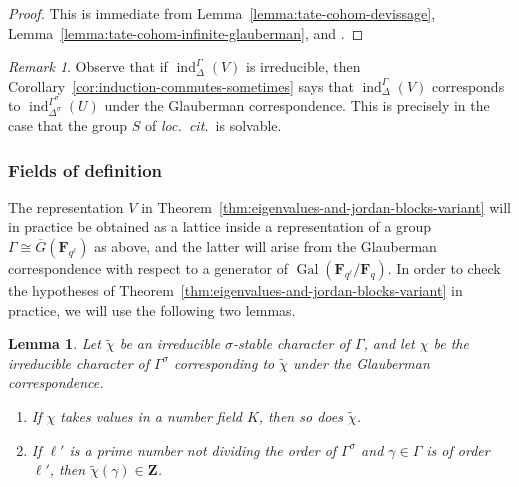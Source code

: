 \documentclass[reqno]{amsart}
\numberwithin{equation}{subsection}
\newcommand{\F}{\mathbf{F}}
\newcommand{\Z}{\mathbf{Z}}
\newcommand{\Gal}{\operatorname{Gal}}
\newcommand{\ol}[1]{\overline{#1}}
\DeclareMathOperator{\ind}{ind}
\newtheorem{lemma}[thm]{Lemma}
\theoremstyle{remark}
\newtheorem{remark}[thm]{Remark}
\numberwithin{equation}{subsection}
\numberwithin{figure}{subsection}
\begin{document}
\begin{proof}
    This is immediate from Lemma~\ref{lemma:tate-cohom-devissage}, Lemma~\ref{lemma:tate-cohom-infinite-glauberman}, and \cite[Proposition~3.3]{TV}. 
\end{proof}

\begin{remark}\label{remark:isaacs-navarro}
    Observe that if $\ind_\Delta^\Gamma(V)$ is irreducible, then Corollary~\ref{cor:induction-commutes-sometimes} says that $\ind_\Delta^\Gamma(V)$ corresponds to $\ind_{\Delta^\sigma}^{\Gamma^\sigma}(U)$ under the Glauberman correspondence. This is precisely \cite[Theorem~A (a)]{IN91} in the case that the group $S$ of \textit{loc.\ cit.}\ is solvable.
\end{remark}

\subsubsection{Fields of definition} The representation $V$ in Theorem~\ref{thm:eigenvalues-and-jordan-blocks-variant} will in practice be obtained as a lattice inside a representation of a group $\Gamma \cong \ol G(\F_{q^\ell})$ as above, and the latter will arise from the Glauberman correspondence with respect to a generator of $\Gal(\F_{q^\ell}/\F_q)$. In order to check the hypotheses of Theorem~\ref{thm:eigenvalues-and-jordan-blocks-variant} in practice, we will use the following two lemmas.

\begin{lemma}\label{lemma:integer-valued-characters}
    Let $\widetilde{\chi}$ be an irreducible $\sigma$-stable character of $\Gamma$, and let $\chi$ be the irreducible character of $\Gamma^\sigma$ corresponding to $\widetilde{\chi}$ under the Glauberman correspondence.
    \begin{enumerate}
        \item If $\chi$ takes values in a number field $K$, then so does $\widetilde{\chi}$.
        \item If $\ell'$ is a prime number not dividing the order of $\Gamma^\sigma$ and $\gamma \in \Gamma$ is of order $\ell'$, then $\widetilde{\chi}(\gamma) \in \Z$.
    \end{enumerate}
\end{lemma}
\end{document}
